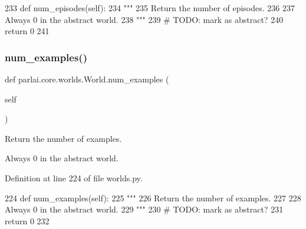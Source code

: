 \begin{DoxyCode}
233     \textcolor{keyword}{def }num\_episodes(self):
234         \textcolor{stringliteral}{"""}
235 \textcolor{stringliteral}{        Return the number of episodes.}
236 \textcolor{stringliteral}{}
237 \textcolor{stringliteral}{        Always 0 in the abstract world.}
238 \textcolor{stringliteral}{        """}
239         \textcolor{comment}{# TODO: mark as abstract?}
240         \textcolor{keywordflow}{return} 0
241 
\end{DoxyCode}
\mbox{\label{classparlai_1_1core_1_1worlds_1_1World_a0402b615564d760fac542b8c5a504be5}} 
\subsubsection{\texorpdfstring{num\+\_\+examples()}{num\_examples()}}
{\footnotesize\ttfamily def parlai.\+core.\+worlds.\+World.\+num\+\_\+examples (\begin{DoxyParamCaption}\item[{}]{self }\end{DoxyParamCaption})}

\begin{DoxyVerb}Return the number of examples.

Always 0 in the abstract world.
\end{DoxyVerb}
 

Definition at line 224 of file worlds.\+py.


\begin{DoxyCode}
224     \textcolor{keyword}{def }num\_examples(self):
225         \textcolor{stringliteral}{"""}
226 \textcolor{stringliteral}{        Return the number of examples.}
227 \textcolor{stringliteral}{}
228 \textcolor{stringliteral}{        Always 0 in the abstract world.}
229 \textcolor{stringliteral}{        """}
230         \textcolor{comment}{# TODO: mark as abstract?}
231         \textcolor{keywordflow}{return} 0
232 
\end{DoxyCode}
\mbox{\label{classparlai_1_1core_1_1worlds_1_1World_ac7e23e08adad68116e72162cd419786b}} 
